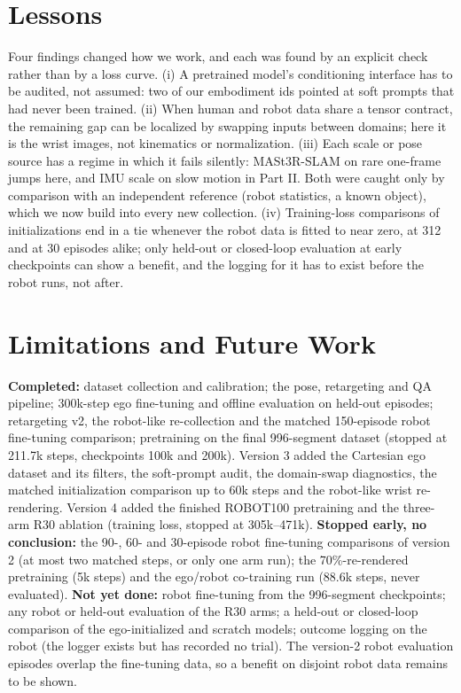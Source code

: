 \documentclass[conference,10pt]{IEEEtran}
\begin{document}
\section{Lessons}\label{sec:lessons}
Four findings changed how we work, and each was found by an explicit check rather than by a loss curve. (i) A pretrained
model's conditioning interface has to be audited, not assumed: two of our embodiment ids pointed at soft prompts that had never
been trained. (ii) When human and robot data share a tensor contract, the remaining gap can be localized by swapping inputs
between domains; here it is the wrist images, not kinematics or normalization. (iii) Each scale or pose source has a regime in
which it fails silently: MASt3R-SLAM on rare one-frame jumps here, and IMU scale on slow motion in Part II. Both were caught only
by comparison with an independent reference (robot statistics, a known object), which we now build into every new collection.
(iv) Training-loss comparisons of initializations end in a tie whenever the robot data is fitted to near zero, at 312 and at
30 episodes alike; only held-out or closed-loop evaluation at early checkpoints can show a benefit, and the logging for it has
to exist before the robot runs, not after.

\section{Limitations and Future Work}\label{sec:lim}
\textbf{Completed:} dataset collection and calibration; the pose, retargeting and QA pipeline; 300k-step ego fine-tuning and
offline evaluation on held-out episodes; retargeting v2, the robot-like re-collection and the matched 150-episode robot
fine-tuning comparison; pretraining on the final 996-segment dataset (stopped at 211.7k steps, checkpoints 100k and 200k).
Version 3 added the Cartesian ego dataset and its filters, the soft-prompt audit, the domain-swap diagnostics, the matched
initialization comparison up to 60k steps and the robot-like wrist re-rendering. Version 4 added the finished ROBOT100
pretraining and the three-arm R30 ablation (training loss, stopped at 305k--471k). \textbf{Stopped early, no conclusion:} the
90-, 60- and 30-episode robot fine-tuning comparisons of version 2 (at most two matched steps, or only one arm run); the
70\%-re-rendered pretraining (5k steps) and the ego/robot co-training run (88.6k steps, never evaluated).
\textbf{Not yet done:} robot fine-tuning from the 996-segment checkpoints; any robot or held-out evaluation of the R30 arms;
a held-out or closed-loop comparison of the ego-initialized and scratch models; outcome logging on the robot (the logger
exists but has recorded no trial). The version-2 robot evaluation episodes overlap the
fine-tuning data, so a benefit on disjoint robot data remains to be shown.
\end{document}

